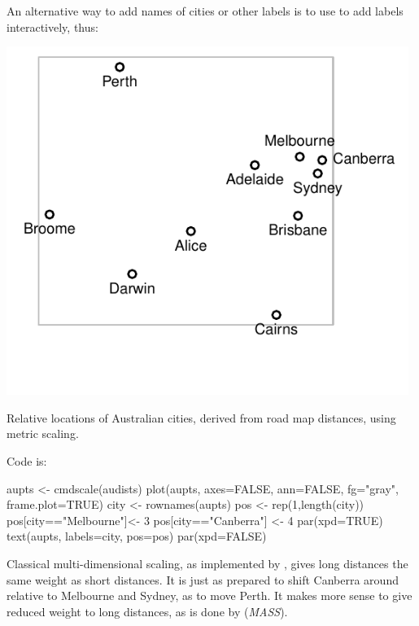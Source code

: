 \noindent
An alternative way to add names of cities or other labels is to use
 to add labels interactively, thus:


\begin{marginfigure}
\begin{Schunk}


\centerline{\includegraphics[width=0.98\textwidth]{figs/9-aupoints-1} }

\end{Schunk}
\caption{Relative locations of Australian cities, derived from road
  map distances, using metric scaling.\label{fig:audists}}
\end{marginfigure}
Code is:
\begin{Schunk}
\begin{Sinput}
aupts <- cmdscale(audists)
plot(aupts, axes=FALSE, ann=FALSE, fg="gray",
     frame.plot=TRUE)
city <- rownames(aupts)
pos <- rep(1,length(city))
pos[city=="Melbourne"]<- 3
pos[city=="Canberra"] <- 4
par(xpd=TRUE)
text(aupts, labels=city, pos=pos)
par(xpd=FALSE)
\end{Sinput}
\end{Schunk}


Classical multi-dimensional scaling, as implemented by
 , gives long distances the same weight as short
 distances.  It is just as prepared to shift Canberra around relative
 to Melbourne and Sydney, as to move Perth.  It makes more sense to
 give reduced weight to long distances, as is done by 
 (\textit{MASS}).




